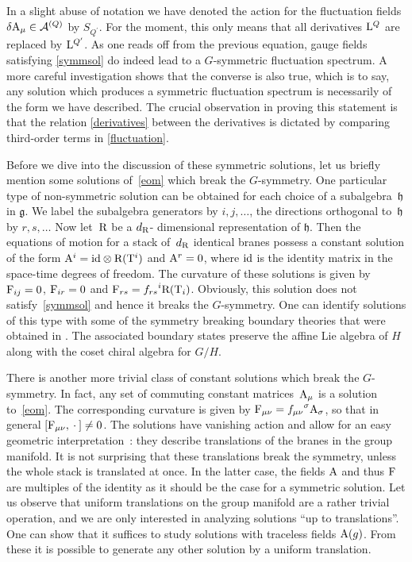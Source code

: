 \documentclass[12pt,a4paper]{article}
\newcommand{\mf}{\mathfrak} %
\newcommand{\mc}{\mathcal} %
\def\tT{{\rm T}} %
\def\tR{{\rm R}} %
\def\tF{{\rm F}}
\def\tA{{\rm A}}
\def\tL{{\rm L}}
\def\id{{\rm id}}
\begin{document}
In a slight abuse of notation we have denoted the action 
for the fluctuation fields $\delta \tA_\mu \in \mc{A}^{(Q)}$ 
by $S_{Q^\prime}$. For the moment, this only means that 
all derivatives $\tL^Q$ are replaced by $\tL^{Q^\prime}$.   
As one reads off from the previous equation, gauge fields 
satisfying \eqref{symmsol} do indeed lead to a $G$-symmetric 
fluctuation spectrum. A more careful investigation shows 
that the converse is also true, which is to say, any solution which
produces a symmetric fluctuation spectrum is necessarily of 
the form we have described. The crucial observation in proving this
statement is that the relation \eqref{derivatives} 
between the derivatives is dictated by comparing third-order 
terms in \eqref{fluctuation}.
\medskip

Before we dive into the discussion of these symmetric solutions, let
us briefly mention some solutions of~\eqref{eom} which break the 
$G$-symmetry. One particular type of non-symmetric solution can be
obtained for each choice of a subalgebra~$\mf{h}$ in $\mf{g}$. We 
label the subalgebra generators by $i,j,\ldots$, the directions 
orthogonal to~$\mf{h}$ by $r,s,\ldots$ Now let~$\tR$ be a $d_{\tR}$-%
dimensional representation of $\mf{h}$. Then the equations of motion 
for a stack of~$d_{\tR}$ identical branes possess a constant solution 
of the form $\tA^{i}=\id \otimes \tR(\tT^i)$ and  $\tA^{r}=0$, where
$\id$ is the identity matrix in the space-time degrees of freedom. 
The curvature of these solutions is given by $\tF_{ij}=0$, $\tF_{ir}=0$
and $\tF_{rs}={f_{rs}}^{i}\tR(\tT_i)$. Obviously, this solution does 
not satisfy~\eqref{symmsol} and hence it breaks the $G$-symmetry. One
can identify solutions of this type with some of the symmetry 
breaking boundary theories that were obtained in \cite{Quella:2002ct}. The
associated boundary states preserve the affine Lie algebra of $H$ 
along with the coset chiral algebra for $G/H$.  
\medskip

There is another more trivial class of constant solutions which break 
the $G$-symmetry. In fact, any set of commuting constant matrices~$\tA_{\mu}$ 
is  a solution to~\eqref{eom}. The corresponding curvature is given 
by $\tF_{\mu\nu}={f_{\mu\nu}}^{\sigma}\tA_{\sigma}$, so that in general
$[\tF_{\mu\nu},\:\cdot\:]\neq 0$. The solutions have vanishing action 
and allow for an easy geometric interpretation~\cite{Recknagel:1998ih,
Alekseev:2000fd}:  
they describe translations of the branes in the group manifold. It is 
not surprising that these translations break the symmetry, unless the 
whole stack is translated at once. In the latter case, the fields $\tA$ 
and thus $\tF$ are multiples of the identity as it should be the case 
for a symmetric solution. Let us observe that uniform translations on the 
group manifold are a rather trivial operation, and we are only interested
in analyzing solutions ``up to translations''. One can show that it suffices 
to study solutions with traceless fields $\tA(g)$. From these it is possible
to generate any other solution by a uniform translation.
\medskip 
\end{document}
